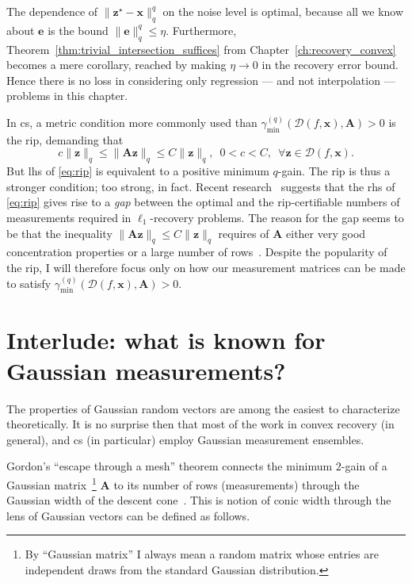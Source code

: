 The dependence of $\|\mathbf{z}^\star - \mathbf{x}\|_q^q$ on the noise level is optimal, because all we know about $\mathbf{e}$ is the bound $\|\mathbf{e}\|_q^{q} \leq \eta$. Furthermore, Theorem~\ref{thm:trivial_intersection_suffices} from Chapter~\ref{ch:recovery_convex} becomes a mere corollary, reached by making $\eta \to 0$ in the recovery error bound. Hence there is no loss in considering only regression --- and not interpolation --- problems in this chapter.

In \acrlong{cs}, a metric condition more commonly used than $\gamma_{\min}^{(q)} \left ( \mathcal{D}( f, \mathbf{x}), \mathbf{A} \right ) > 0$ is the \acrfull{rip}, demanding that
\begin{equation}
    c \|\mathbf{z}\|_q \leq \|\mathbf{Az}\|_q \leq C\|\mathbf{z}\|_q, \enspace 0< c < C, \enspace \forall \mathbf{z} \in \mathcal{D}( f, \mathbf{x}).
    \label{eq:rip}
\end{equation}
But \acrlong{lhs} of \eqref{eq:rip} is equivalent to a positive minimum $q$-gain. The \acrshort{rip} is thus a stronger condition; too strong, in fact. Recent research~\cite{dirksen2018a} suggests that the \acrlong{rhs} of \eqref{eq:rip} gives rise to a \emph{gap} between the optimal and the \acrshort{rip}-certifiable numbers of measurements required in $\ell_1$-recovery problems. The reason for the gap seems to be that the inequality $\|\mathbf{Az}\|_q \leq C\|\mathbf{z}\|_q$ requires of $\mathbf{A}$ either very good concentration properties or a large number of rows~\cite{lecue2017}. Despite the popularity of the \acrshort{rip}, I will therefore focus only on how our measurement matrices can be made to satisfy $\gamma_{\min}^{(q)} \left ( \mathcal{D}( f, \mathbf{x}), \mathbf{A} \right ) > 0$.


\section{Interlude: what is known for Gaussian measurements?}

The properties of Gaussian random vectors are among the easiest to characterize theoretically. It is no surprise then that most of the work in convex recovery \cite{chandrasekaran2012, tropp2015a, vershynin2015a, plan2016, liaw2017, plan2017, vershynin2017} (in general), and \acrlong{cs} \cite{foucart2013, foygel2014, dirksen2018, dirksen2018a} (in particular) employ Gaussian measurement ensembles.

Gordon's ``escape through a mesh'' theorem \cite[Cor. 1.2]{gordon1988} connects the minimum $2$-gain of  a Gaussian matrix~\footnote{By ``Gaussian matrix'' I always mean a random matrix whose entries are independent draws from the standard Gaussian distribution.} $\mathbf{A}$ to its number of rows (measurements) through the Gaussian width of the descent cone~\cite[Cor. 3.3]{chandrasekaran2012}. This is notion of conic width through the lens of Gaussian vectors can be defined as follows.

